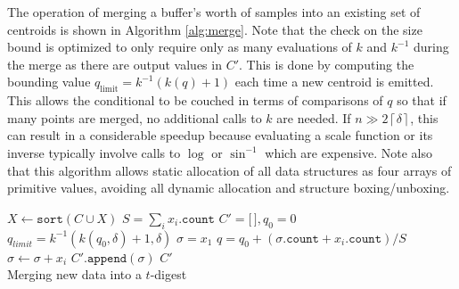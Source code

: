 \documentclass[11pt]{amsart}
\begin{document}
The operation of merging a buffer's worth of samples into an existing set of centroids is shown in Algorithm \ref{alg:merge}. Note that the check on the size bound is optimized to only require only as many evaluations of $k$ and $k^{-1}$ during the merge as there are output values in $C'$. This is done by computing the bounding value $q_{\mathrm {limit}} = k^{-1}(k(q) + 1)$ each time a new centroid is emitted. This allows the conditional to be couched in terms of comparisons of $q$ so that if many points are merged, no additional calls to $k$ are needed. If $n \gg 2 \left \lceil \delta \right \rceil$, this can result in a considerable speedup because evaluating a scale function or its inverse typically involve calls to $\log$ or $\sin^{-1}$ which are expensive. Note also that this algorithm allows static allocation of all data structures as four arrays of primitive values, avoiding all dynamic allocation and structure boxing/unboxing.
\begin{algorithm}[ht]
 \label{alg:merge}
\SetNoFillComment
{}
$X \gets \mathtt{sort}(C \cup X)$\;
$ S = \sum_i x_i.\mathtt{count}$\;
$C' = \lbrack \, \rbrack, q_0 = 0$\;
$q_{limit}=k^{-1}(k(q_0, \delta)+1, \delta)$\;
$\sigma = x_1$\;
 {
  $q = q_0 + (\sigma.\mathtt{count} + x_i.\mathtt{count})/S$\;
   {
      $\sigma \gets \sigma + x_i$\;
  } 
} 
$C'\mathtt{.append}(\sigma)$\;
\Return $ C' $\\
\caption{Merging new data into a $t$-digest}
\end{algorithm}
\end{document}

